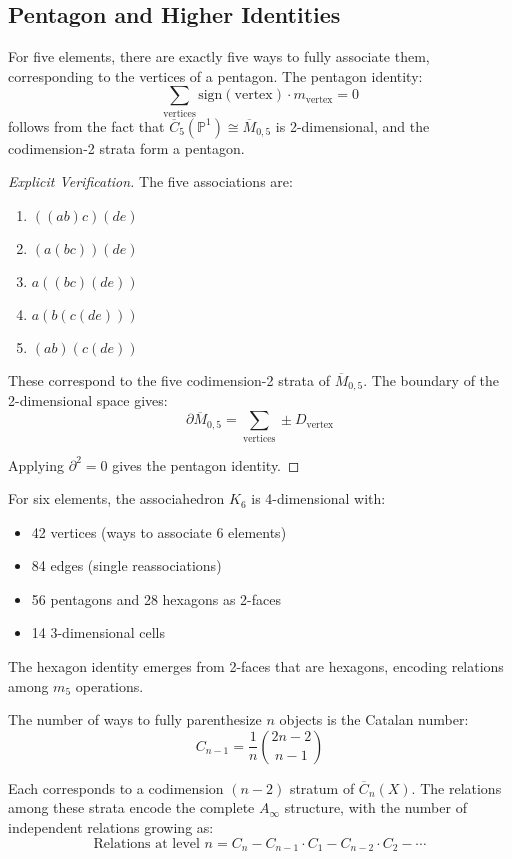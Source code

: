 \subsection{Pentagon and Higher Identities}

\begin{theorem}
For five elements, there are exactly five ways to fully associate them, corresponding to the vertices of a pentagon. The pentagon identity:
$$\sum_{\text{vertices}} \text{sign}(\text{vertex}) \cdot m_{\text{vertex}} = 0$$
follows from the fact that $\overline{C}_5(\mathbb{P}^1) \cong \overline{M}_{0,5}$ is 2-dimensional, and the codimension-2 strata form a pentagon.
\end{theorem}

\begin{proof}[Explicit Verification]
The five associations are:
\begin{enumerate}
\item $((ab)c)(de)$
\item $(a(bc))(de)$  
\item $a((bc)(de))$
\item $a(b(c(de)))$
\item $(ab)(c(de))$
\end{enumerate}

These correspond to the five codimension-2 strata of $\overline{M}_{0,5}$. The boundary of the 2-dimensional space gives:
$$\partial \overline{M}_{0,5} = \sum_{\text{vertices}} \pm D_{\text{vertex}}$$

Applying $\partial^2 = 0$ gives the pentagon identity.
\end{proof}

\begin{theorem}
For six elements, the associahedron $K_6$ is 4-dimensional with:
\begin{itemize}
\item 42 vertices (ways to associate 6 elements)
\item 84 edges (single reassociations)
\item 56 pentagons and 28 hexagons as 2-faces
\item 14 3-dimensional cells
\end{itemize}

The hexagon identity emerges from 2-faces that are hexagons, encoding relations among $m_5$ operations.
\end{theorem}

\begin{theorem}
The number of ways to fully parenthesize $n$ objects is the Catalan number:
$$C_{n-1} = \frac{1}{n}\binom{2n-2}{n-1}$$

Each corresponds to a codimension $(n-2)$ stratum of $\overline{C}_n(X)$. The relations among these strata encode the complete $A_\infty$ structure, with the number of independent relations growing as:
$$\text{Relations at level } n = C_n - C_{n-1} \cdot C_1 - C_{n-2} \cdot C_2 - \cdots$$
\end{theorem}

